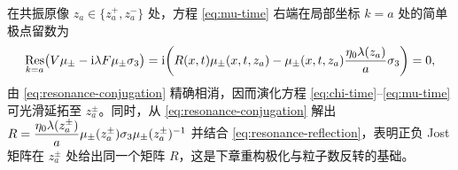 \begin{remark}
在共振原像 $z_a\in\{z_a^+,z_a^-\}$ 处，方程 \eqref{eq:mu-time} 右端在局部坐标 $k=a$ 处的简单极点留数为
\begin{equation*}
\operatorname*{Res}\limits_{k=a}\bigl(V\mu_\pm-\mathrm{i}\lambda F\mu_\pm\sigma_3\bigr)
=\mathrm{i}\!\left(R(x,t)\mu_\pm(x,t,z_a)-\mu_\pm(x,t,z_a)\dfrac{\eta_0\lambda(z_a)}{a}\sigma_3\right)=0,
\end{equation*}
由 \eqref{eq:resonance-conjugation} 精确相消，因而演化方程 \eqref{eq:chi-time}--\eqref{eq:mu-time} 可光滑延拓至 $z_a^\pm$。同时，从 \eqref{eq:resonance-conjugation} 解出 $R=\dfrac{\eta_0\lambda(z_a^\pm)}{a}\mu_\pm(z_a^\pm)\sigma_3\mu_\pm(z_a^\pm)^{-1}$ 并结合 \eqref{eq:resonance-reflection}，表明正负 Jost 矩阵在 $z_a^\pm$ 处给出同一个矩阵 $R$，这是下章重构极化与粒子数反转的基础。
\end{remark}

